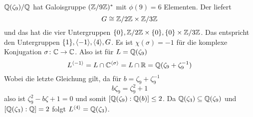 \begin{Bsp}
	\(\mathbb{Q}(\zeta_9)/\mathbb{Q}\) hat Galoisgruppe \((\mathbb{Z}/9\mathbb{Z})^*\) mit \(\phi(9)=6\) Elementen. Der  liefert \[G\cong \mathbb{Z}/2\mathbb{Z}\times \mathbb{Z}/3\mathbb{Z}\] und das hat die vier Untergruppen \(\{0\},\mathbb{Z}/2\mathbb{Z}\times\{0\}, \{0\}\times\mathbb{Z}/3\mathbb{Z}\).
	Das entspricht den Untergruppen \(\{1\}, \langle-1\rangle, \langle 4\rangle,G\).
	Es ist \(\chi(\sigma)=-1\) für die komplexe Konjugation \(\sigma\colon\mathbb{C}\to\mathbb{C}\). Also ist für \(L=\mathbb{Q}(\zeta_9)\)
	\[L^{\langle -1\rangle}=L\cap \mathbb{C}^{\langle \sigma\rangle}=L\cap\mathbb{R}=\mathbb{Q}(\zeta_9+\zeta_9^{-1})\]
	Wobei die letzte Gleichung gilt, da für \(b=\zeta_9+\zeta_9^{-1}\)
	\[b\zeta_9=\zeta_9^2+1\] also ist \(\zeta_9^2-b\zeta+1=0\) und somit \([\mathbb{Q}(\zeta_9):\mathbb{Q}(b)]\leq 2\).
	Da \(\mathbb{Q}(\zeta_3)\subseteq \mathbb{Q}(\zeta_9)\) und \([\mathbb{Q}(\zeta_3):\mathbb{Q}]=2\) folgt \(L^{\langle 4\rangle}=\mathbb{Q}(\zeta_3)\).
\end{Bsp}
